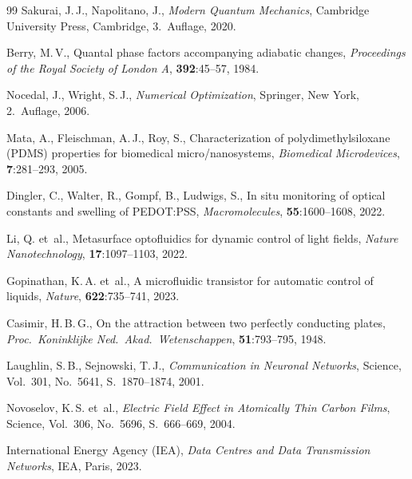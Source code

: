 ﻿\documentclass[a4paper,12pt]{scrreprt}
\theoremstyle{definition}
\begin{document}
\begin{thebibliography}{99}
  Sakurai, J.\,J., Napolitano, J.,
  \textit{Modern Quantum Mechanics},
  Cambridge University Press, Cambridge, 3.~Auflage, 2020.

  Berry, M.\,V.,
  Quantal phase factors accompanying adiabatic changes,
  \textit{Proceedings of the Royal Society of London A},
  \textbf{392}:45--57, 1984.

  Nocedal, J., Wright, S.\,J.,
  \textit{Numerical Optimization},
  Springer, New York, 2.~Auflage, 2006.

  Mata, A., Fleischman, A.\,J., Roy, S.,
  Characterization of polydimethylsiloxane (PDMS) properties for
  biomedical micro/nanosystems,
  \textit{Biomedical Microdevices}, \textbf{7}:281--293, 2005.

  Dingler, C., Walter, R., Gompf, B., Ludwigs, S.,
  In situ monitoring of optical constants and swelling of PEDOT:PSS,
  \textit{Macromolecules}, \textbf{55}:1600--1608, 2022.

  Li, Q. et~al.,
  Metasurface optofluidics for dynamic control of light fields,
  \textit{Nature Nanotechnology}, \textbf{17}:1097--1103, 2022.

  Gopinathan, K.\,A. et~al.,
  A microfluidic transistor for automatic control of liquids,
  \textit{Nature}, \textbf{622}:735--741, 2023.

  Casimir, H.\,B.\,G.,
  On the attraction between two perfectly conducting plates,
  \textit{Proc.\ Koninklijke Ned.\ Akad.\ Wetenschappen}, \textbf{51}:793--795, 1948.

  Laughlin, S.\,B., Sejnowski, T.\,J.,
  \textit{Communication in Neuronal Networks},
  Science, Vol.~301, No.~5641, S.~1870--1874, 2001.

  Novoselov, K.\,S. et~al.,
  \textit{Electric Field Effect in Atomically Thin Carbon Films},
  Science, Vol.~306, No.~5696, S.~666--669, 2004.

  International Energy Agency (IEA),
  \textit{Data Centres and Data Transmission Networks},
  IEA, Paris, 2023.

\end{thebibliography}
\end{document}
